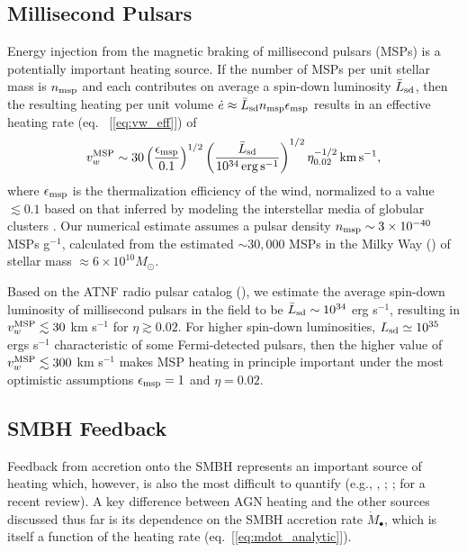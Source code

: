 \documentclass[usenatbib,fleqn]{mn2e}
\begin{document}
\subsection{Millisecond Pulsars}
Energy injection from the magnetic braking of millisecond pulsars
(MSPs) is a potentially important heating source.  If the number of
MSPs per unit stellar mass is $n_{\rm msp}$ and each contributes on
average a spin-down luminosity $\bar{L}_{\rm sd}$, then the resulting
heating per unit volume $\dot{e} \approx \bar{L}_{\rm sd}n_{\rm
  msp}\epsilon_{\rm msp}$ results in an effective heating rate (eq.~
[\ref{eq:vw_eff}]) of
\begin{eqnarray} v_{w}^{\rm MSP} \sim
30\left(\frac{\epsilon_{\rm msp}}{0.1}\right)^{1/2}\left(\frac{\bar{L}_{\rm
sd}}{10^{34}\,{\rm erg\,s^{-1}}}\right)^{1/2} \eta_{0.02}^{-1/2}\,{\rm
km\,s^{-1}},
 \label{eq:vmsp}
  \end{eqnarray} 
  where $\epsilon_{\rm msp}$ is the thermalization efficiency of the
  wind, normalized to a value $\lesssim 0.1$ based on that inferred by
  modeling the interstellar media of globular clusters
  \citep{NaimanSoares-Furtado+:2013a}.  Our numerical estimate assumes
  a pulsar density $n_{\rm msp} \sim 3 \times 10^{-40} $ MSPs
  g$^{-1}$, calculated from the estimated $\sim 30,000$ MSPs in the
  Milky Way (\citealt{Lorimer13}) of stellar mass $\approx 6\times
  10^{10}M_{\odot}$.

  Based on the ATNF radio pulsar catalog (\citealt{Manchester+05}), we
  estimate the average spin-down luminosity of millisecond pulsars in
  the field to be $\bar{L}_{\rm sd} \sim 10^{34}$ erg s$^{-1}$,
  resulting in $v_{w}^{\rm MSP} \lesssim 30$ km s$^{-1}$ for $\eta
  \gtrsim 0.02$.  For higher spin-down luminosities, $L_{\rm sd}\simeq
  10^{35}$ ergs s$^{-1}$ characteristic of some Fermi-detected
  pulsars, then the higher value of $v_{w}^{\rm MSP} \lesssim 300$ km
  s$^{-1}$ makes MSP heating in principle important under the most
  optimistic assumptions $\epsilon_{\rm msp} = 1$ and $\eta = 0.02$.



\subsection{SMBH Feedback}

Feedback from accretion onto the SMBH represents an important source
of heating which, however, is also the most difficult to quantify
(e.g., \citealt{Brighenti&Mathews03}, \citealt{DiMatteo+05};
\citealt{Kurosawa&Proga09}; \citealt{Fabian12} for a recent review).
A key difference between AGN heating and the other sources discussed
thus far is its dependence on the SMBH accretion rate
$\dot{M}_{\bullet}$, which is itself a function of the heating rate
(eq.~[\ref{eq:mdot_analytic}]).
\end{document}
